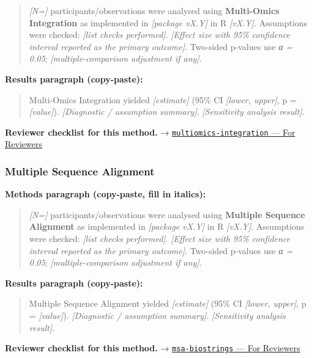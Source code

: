\documentclass[
]{article}
\begin{document}
\begin{quote}
\emph{{[}N={]}} participants/observations were analysed using
\textbf{Multi-Omics Integration} as implemented in \emph{{[}package
vX.Y{]}} in R \emph{{[}vX.Y{]}}. Assumptions were checked: \emph{{[}list
checks performed{]}}. \emph{{[}Effect size with 95\% confidence interval
reported as the primary outcome{]}}. Two-sided p-values use \emph{α =
0.05}; \emph{{[}multiple-comparison adjustment if any{]}}.
\end{quote}

\textbf{Results paragraph (copy-paste):}

\begin{quote}
Multi-Omics Integration yielded \emph{{[}estimate{]}} (95\% CI
\emph{{[}lower, upper{]}}, p = \emph{{[}value{]}}). \emph{{[}Diagnostic
/ assumption summary{]}}. \emph{{[}Sensitivity analysis result{]}}.
\end{quote}

\textbf{Reviewer checklist for this method.} →
\href{../chapters/12-bioinformatics/multiomics-integration.Rmd\#for-reviewers}{\texttt{multiomics-integration}
--- For Reviewers}

\subsubsection{Multiple Sequence
Alignment}\label{multiple-sequence-alignment}

\textbf{Methods paragraph (copy-paste, fill in italics):}

\begin{quote}
\emph{{[}N={]}} participants/observations were analysed using
\textbf{Multiple Sequence Alignment} as implemented in \emph{{[}package
vX.Y{]}} in R \emph{{[}vX.Y{]}}. Assumptions were checked: \emph{{[}list
checks performed{]}}. \emph{{[}Effect size with 95\% confidence interval
reported as the primary outcome{]}}. Two-sided p-values use \emph{α =
0.05}; \emph{{[}multiple-comparison adjustment if any{]}}.
\end{quote}

\textbf{Results paragraph (copy-paste):}

\begin{quote}
Multiple Sequence Alignment yielded \emph{{[}estimate{]}} (95\% CI
\emph{{[}lower, upper{]}}, p = \emph{{[}value{]}}). \emph{{[}Diagnostic
/ assumption summary{]}}. \emph{{[}Sensitivity analysis result{]}}.
\end{quote}

\textbf{Reviewer checklist for this method.} →
\href{../chapters/12-bioinformatics/msa-biostrings.Rmd\#for-reviewers}{\texttt{msa-biostrings}
--- For Reviewers}
\end{document}
